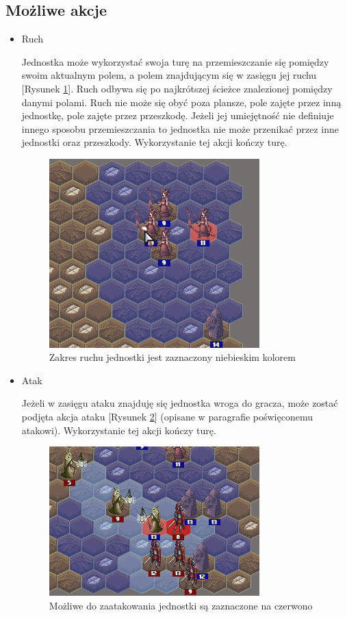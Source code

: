 \documentclass[letterpaper,12pt]{article}
\begin{document}
\subsection{Możliwe akcje}
\begin{itemize}  
\item Ruch 
\par Jednostka może wykorzystać swoja turę na przemieszczanie się pomiędzy swoim aktualnym polem, a polem znajdującym się w zasięgu jej ruchu [Rysunek \ref{fig:moveRange}]. Ruch odbywa się po najkrótszej ścieżce znalezionej pomiędzy danymi polami. Ruch nie może się obyć poza plansze, pole zajęte przez inną jednostkę, pole zajęte przez przeszkodę. Jeżeli jej umiejętność nie definiuje innego sposobu przemieszczania to jednostka nie może przenikać przez inne jednostki oraz przeszkody. Wykorzystanie tej akcji kończy turę. 

\begin{figure}[H]
 \centering
  \includegraphics[width=3.2in]{moveRange.png}
  \caption{Zakres ruchu jednostki jest zaznaczony niebieskim kolorem}
  \label{fig:moveRange}
\end{figure}

\item Atak
\par Jeżeli w zasięgu ataku znajduję się jednostka wroga do gracza, może zostać podjęta akcja ataku [Rysunek \ref{fig:attackRange}] (opisane w paragrafie poświęconemu atakowi). Wykorzystanie tej akcji kończy turę. 

\begin{figure}[H]
 \centering
  \includegraphics[width=3.2in]{attackRange.png}
  \caption{Możliwe do zaatakowania jednostki są zaznaczone na czerwono}
  \label{fig:attackRange}
\end{figure}


\end{itemize}
\end{document}
